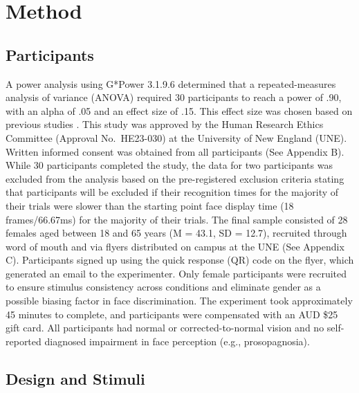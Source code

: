 \documentclass[
  10pt,
  letterpaper,
]{article}
\begin{document}
\section{Method}\label{method}

\subsection{Participants}\label{participants}

A power analysis using G*Power 3.1.9.6 \citep{faul2009a} determined that
a repeated-measures analysis of variance (ANOVA) required 30
participants to reach a power of .90, with an alpha of .05 and an effect
size of .15. This effect size was chosen based on previous studies
\citep{campbell2021a, zimmermann2019a}. This study was approved by the
Human Research Ethics Committee (Approval No.~HE23-030) at the
University of New England (UNE). Written informed consent was obtained
from all participants (See Appendix B). While 30 participants completed
the study, the data for two participants was excluded from the analysis
based on the pre-registered exclusion criteria stating that participants
will be excluded if their recognition times for the majority of their
trials were slower than the starting point face display time (18
frames/66.67ms) for the majority of their trials. The final sample
consisted of 28 females aged between 18 and 65 years (M = 43.1, SD =
12.7), recruited through word of mouth and via flyers distributed on
campus at the UNE (See Appendix C). Participants signed up using the
quick response (QR) code on the flyer, which generated an email to the
experimenter. Only female participants were recruited to ensure stimulus
consistency across conditions and eliminate gender as a possible biasing
factor in face discrimination. The experiment took approximately 45
minutes to complete, and participants were compensated with an AUD \$25
gift card. All participants had normal or corrected-to-normal vision and
no self-reported diagnosed impairment in face perception (e.g.,
prosopagnosia).

\subsection{Design and Stimuli}\label{design-and-stimuli}
\end{document}
